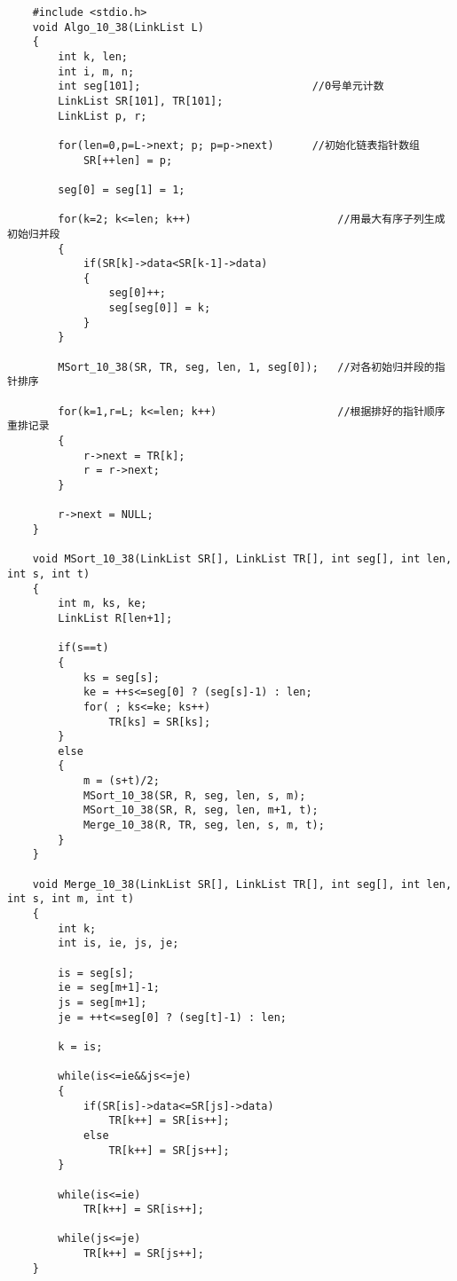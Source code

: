 \documentclass[UTF8,a4paper]{article}
\begin{document}
\begin{lstlisting}
    #include <stdio.h>
    void Algo_10_38(LinkList L)
    {
        int k, len;
        int i, m, n;
        int seg[101];							//0号单元计数 
        LinkList SR[101], TR[101];
        LinkList p, r;
        
        for(len=0,p=L->next; p; p=p->next)		//初始化链表指针数组 
            SR[++len] = p;
        
        seg[0] = seg[1] = 1;
        
        for(k=2; k<=len; k++)						//用最大有序子列生成初始归并段 
        {
            if(SR[k]->data<SR[k-1]->data)
            {
                seg[0]++;
                seg[seg[0]] = k;
            }
        }
            
        MSort_10_38(SR, TR, seg, len, 1, seg[0]);	//对各初始归并段的指针排序 
            
        for(k=1,r=L; k<=len; k++)					//根据排好的指针顺序重排记录
        {
            r->next = TR[k];
            r = r->next;
        }
        
        r->next = NULL;
    }
    
    void MSort_10_38(LinkList SR[], LinkList TR[], int seg[], int len, int s, int t)
    {
        int m, ks, ke;
        LinkList R[len+1];
        
        if(s==t)
        {
            ks = seg[s];
            ke = ++s<=seg[0] ? (seg[s]-1) : len;
            for( ; ks<=ke; ks++)
                TR[ks] = SR[ks];
        }
        else
        {
            m = (s+t)/2;
            MSort_10_38(SR, R, seg, len, s, m);
            MSort_10_38(SR, R, seg, len, m+1, t);
            Merge_10_38(R, TR, seg, len, s, m, t);
        }	
    }
    
    void Merge_10_38(LinkList SR[], LinkList TR[], int seg[], int len, int s, int m, int t)
    {
        int k;
        int is, ie, js, je;
        
        is = seg[s];
        ie = seg[m+1]-1;
        js = seg[m+1];
        je = ++t<=seg[0] ? (seg[t]-1) : len;
        
        k = is;
        
        while(is<=ie&&js<=je)
        {
            if(SR[is]->data<=SR[js]->data)
                TR[k++] = SR[is++];
            else
                TR[k++] = SR[js++];
        }
        
        while(is<=ie)
            TR[k++] = SR[is++];
    
        while(js<=je)
            TR[k++] = SR[js++];
    }
    

\end{lstlisting}
\end{document}
